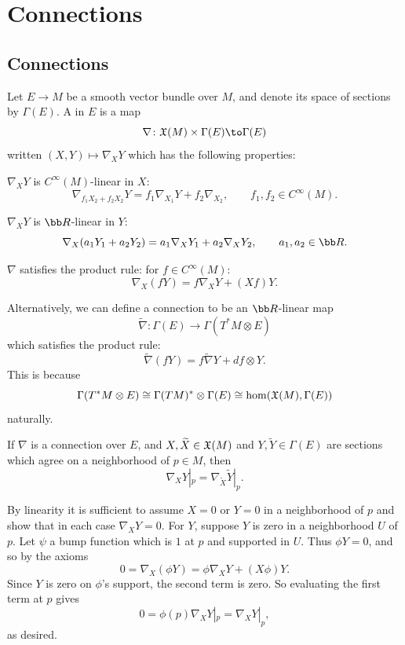 \section{Connections}

\subsection{Connections}

\bdefn

    Let $E\to M$ be a smooth vector bundle over $M$, and denote its space of sections by $\Gamma(E)$.
    A  in $E$ is a map
    $$ \nabla\colon\X(M)\times\Gamma(E)\to\Gamma(E) $$
    written $(X,Y)\mapsto\nabla_XY$ which has the following properties:
    \benum
        \item $\nabla_XY$ is $C^\infty(M)$-linear in $X$:
        $$ \nabla_{f_1X_2+f_2X_2}Y = f_1\nabla_{X_1}Y + f_2\nabla_{X_2},\qquad f_1,f_2\in C^\infty(M). $$
        \item $\nabla_XY$ is $\bR$-linear in $Y$:
        $$ \nabla_X(a_1Y_1+a_2Y_2) = a_1\nabla_XY_1 + a_2\nabla_XY_2,\qquad a_1,a_2\in\bR . $$
        \item $\nabla$ satisfies the product rule: for $f\in C^\infty(M)$:
        $$ \nabla_X(fY) = f\nabla_XY + (Xf)Y . $$
    \eenum

\edefn

\bnote

    Alternatively, we can define a connection to be an $\bR$-linear map
    $$ \tilde\nabla\colon\Gamma(E) \to \Gamma(T^*M\otimes E) $$
    which satisfies the product rule:
    $$ \tilde\nabla(fY) = f\tilde\nabla Y + df\otimes Y . $$
    This is because
    $$ \Gamma(T^*M\otimes E) \cong \Gamma(TM)^* \otimes \Gamma(E) \cong \hom({\frak X}(M),\Gamma(E)) $$
    naturally.

\enote

\blemm

    If $\nabla$ is a connection over $E$, and $X,\widetilde X\in{\frak X}(M)$ and $Y,\tilde Y\in\Gamma(E)$ are sections which agree
    on a neighborhood of $p\in M$, then
    $$ \nabla_XY|_p = \nabla_{\tilde X}\tilde Y|_p . $$

\elemm

\bproof

    By linearity it is sufficient to assume $X=0$ or $Y=0$ in a neighborhood of $p$ and show that in each case
    $\nabla_XY=0$.
    For $Y$, suppose $Y$ is zero in a neighborhood $U$ of $p$.
    Let $\psi$ a bump function which is $1$ at $p$ and supported in $U$.
    Thus $\phi Y=0$, and so by the axioms
    $$ 0 = \nabla_X(\phi Y) = \phi\nabla_XY + (X\phi)Y . $$
    Since $Y$ is zero on $\phi$'s support, the second term is zero.
    So evaluating the first term at $p$ gives
    $$ 0 = \phi(p)\nabla_XY|_p = \nabla_XY|_p , $$
    as desired.

